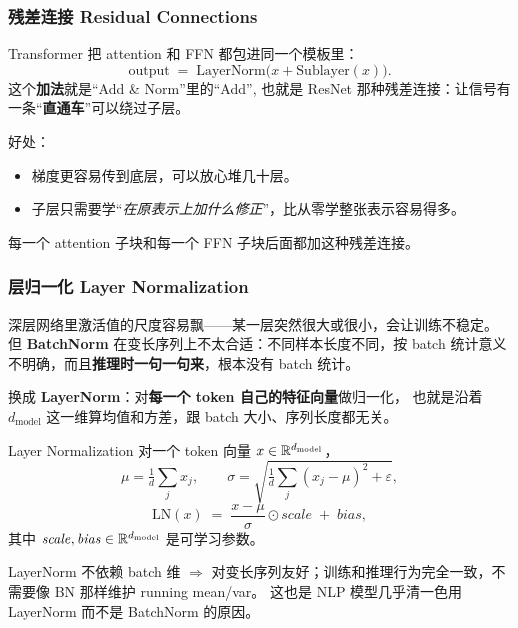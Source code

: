 \subsubsection{残差连接 Residual Connections}

\begin{intuitionblock}
Transformer 把 attention 和 FFN 都包进同一个模板里：
\[
  \text{output} \;=\; \mathrm{LayerNorm}\bigl(x + \mathrm{Sublayer}(x)\bigr) .
\]
这个\textbf{加法}就是``Add \& Norm''里的``Add'',
也就是 ResNet 那种残差连接：让信号有一条``\textbf{直通车}''可以绕过子层。

好处：
\begin{itemize}
  \item 梯度更容易传到底层，可以放心堆几十层。
  \item 子层只需要学``\emph{在原表示上加什么修正}''，比从零学整张表示容易得多。
\end{itemize}
\end{intuitionblock}

每一个 attention 子块和每一个 FFN 子块后面都加这种残差连接。

\subsubsection{层归一化 Layer Normalization}

\begin{problemblock}
深层网络里激活值的尺度容易飘——某一层突然很大或很小，会让训练不稳定。
但 \textbf{BatchNorm} 在变长序列上不太合适：不同样本长度不同，按 batch 统计意义不明确，而且\textbf{推理时一句一句来}，根本没有 batch 统计。
\end{problemblock}

\begin{intuitionblock}
换成 \textbf{LayerNorm}：对\textbf{每一个 token 自己的特征向量}做归一化，
也就是沿着 $d_{\text{model}}$ 这一维算均值和方差，跟 batch 大小、序列长度都无关。
\end{intuitionblock}

\begin{mathbox}{Layer Normalization}
对一个 token 向量 $x \in \mathbb{R}^{d_{\text{model}}}$，
\[
  \mu = \tfrac{1}{d}\sum_{j} x_j,
  \qquad
  \sigma = \sqrt{\tfrac{1}{d}\sum_{j}(x_j - \mu)^2 + \varepsilon},
\]
\[
  \mathrm{LN}(x) \;=\; \frac{x - \mu}{\sigma}\odot \mathit{scale} \;+\; \mathit{bias},
\]
其中 $\mathit{scale}, \mathit{bias} \in \mathbb{R}^{d_{\text{model}}}$ 是可学习参数。
\end{mathbox}

\begin{remark}
LayerNorm 不依赖 batch 维 $\Rightarrow$ 对变长序列友好；训练和推理行为完全一致，不需要像 BN 那样维护 running mean/var。
这也是 NLP 模型几乎清一色用 LayerNorm 而不是 BatchNorm 的原因。
\end{remark}

